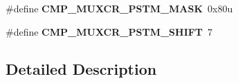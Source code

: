 \begin{DoxyCompactItemize}
\item 
\#define {\bfseries C\+M\+P\+\_\+\+M\+U\+X\+C\+R\+\_\+\+P\+S\+T\+M\+\_\+\+M\+A\+SK}~0x80u\hypertarget{group__CMP__Register__Masks_ga5636686e652e5c89b119ff1954c0e98a}{}\label{group__CMP__Register__Masks_ga5636686e652e5c89b119ff1954c0e98a}

\item 
\#define {\bfseries C\+M\+P\+\_\+\+M\+U\+X\+C\+R\+\_\+\+P\+S\+T\+M\+\_\+\+S\+H\+I\+FT}~7\hypertarget{group__CMP__Register__Masks_gafd77773e4a14b8f22b0b00c52a180d0c}{}\label{group__CMP__Register__Masks_gafd77773e4a14b8f22b0b00c52a180d0c}

\end{DoxyCompactItemize}


\subsection{Detailed Description}
